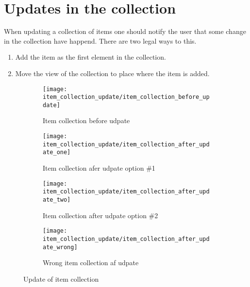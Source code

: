 \FloatBarrier

\section{Updates in the collection}
\label{sec:updates_in_the_collection}

When updating a collection of items one should notify the user that some change in the collection have happend. There are two legal ways to this. 
\begin{enumerate}
    \item Add the item as the first element in the collection.
    \item Move the view of the collection to place where the item is added.
\end{enumerate}

\begin{figure}
    \centering
    \begin{subfigure}[t]{0.4\textwidth}
        \centering
        \texttt{[image: item\_collection\_update/item\_collection\_before\_update]}
        \caption{Item collection before udpate}
        \label{fig:item_collection_before_update}
    \end{subfigure}
    \hspace{5em} 
    \begin{subfigure}[t]{0.4\textwidth}
        \centering
        \texttt{[image: item\_collection\_update/item\_collection\_after\_update\_one]}
        \caption{Item collection afer udpate option \#1}
        \label{fig:item_collection_after_update_one}
    \end{subfigure}
    \vspace{5em}
    \begin{subfigure}[t]{0.4\textwidth}
        \centering
        \texttt{[image: item\_collection\_update/item\_collection\_after\_update\_two]}
        \caption{Item collection after udpate option \#2}
        \label{fig:item_collection_after_update_two}
    \end{subfigure}
    \hspace{5em} 
    \begin{subfigure}[t]{0.4\textwidth}
        \centering
        \texttt{[image: item\_collection\_update/item\_collection\_after\_update\_wrong]}
        \caption{Wrong item collection af udpate}
        \label{fig:item_collection_after_update_wrong}
    \end{subfigure}
    
    \caption{Update of item collection}
    \label{fig:item_collection_update}
\end{figure}



